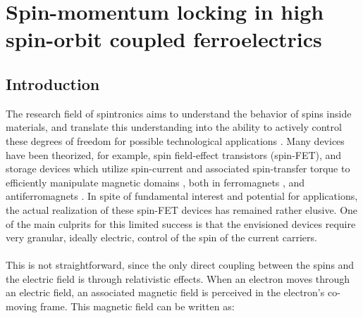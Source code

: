 \newcommand{\Unkr}{u_n(\bm{k}, \bm{r})}
\newcommand{\Eikr}{e^{i\bm{k}\cdot\bm{r}}}
\chapter{Spin-momentum locking in high spin-orbit coupled ferroelectrics \label{ch:Rashba}}
\section{Introduction}
%
The research field of spintronics aims to understand the behavior of spins inside materials, and translate this understanding into the ability to actively control these degrees of freedom for possible technological applications \cite{Joshi2016}.
Many devices have been theorized, for example, spin field-effect transistors (spin-FET)\cite{Datta1990}, and storage devices  which utilize spin-current and associated spin-transfer torque to efficiently manipulate magnetic domains \cite{Kent2015}, both in ferromagnets \cite{Nunez2011}, and antiferromagnets \cite{Nunez2006TheorySemiconductors,Nunez2006TheoryMetals, Jungwirth2016}.
In spite of fundamental interest and potential for applications, the actual realization of these spin-FET devices has remained rather elusive.
One of the main culprits for this limited success is that the envisioned devices require very granular, ideally electric, control of the spin of the current carriers.
\\\\
This is not straightforward, since the only direct coupling between the spins and the electric field is through relativistic effects. When an electron moves through an electric field, an associated magnetic field is perceived in the electron's co-moving frame. This magnetic field can be written as:
